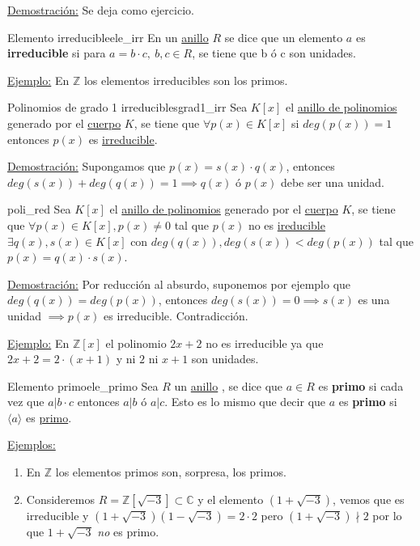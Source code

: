 \documentclass[10pt, a4paper]{article}
\newcommand{\Z}{\mathbb{Z}}
\newcommand{\C}{\mathbb{C}}
\newcommand{\ej}{\underline{Ejemplo:} }
\newcommand{\ejs}{\underline{Ejemplos:} }
\newcommand{\demo}{\underline{Demostración:} }
\newcommand{\anillo}[1][]{\hyperref[def:anillo]{anillo}#1 }
\newcommand{\cuerpo}[1][]{\hyperref[def:cuerpo]{cuerpo}#1 }
\newenvironment{enumeratea}{\begin{enumerate}[label=\arabic*)]}
{\end{enumerate}}
\begin{document}
\demo Se deja como ejercicio.

\begin{definition}{Elemento irreducible}{ele_irr}
En un \anillo $R$ se dice que un elemento $a$ es \textbf{irreducible} si para $a = b \cdot c,\ b, c \in R$, se tiene que b ó c son unidades.
\end{definition}

\ej En $\Z$ los elementos irreducibles son los primos.

\begin{proposition}{Polinomios de grado 1 irreducibles}{grad1_irr}
Sea $K[x]$ el \hyperref[def:anillo_poli]{anillo de polinomios} generado por el \cuerpo $K$, se tiene que $\forall p(x) \in K[x]$ si $deg(p(x)) = 1$ entonces $p(x)$ es \hyperref[def:ele_irr]{irreducible}.
\end{proposition}

\demo Supongamos que $p(x) = s(x) \cdot q(x)$, entonces $deg(s(x)) + deg(q(x)) = 1 \implies q(x) \text{ ó } p(x)$ debe ser una unidad.

\begin{proposition}{}{poli_red}
Sea $K[x]$ el \hyperref[def:anillo_poli]{anillo de polinomios} generado por el \cuerpo $K$, se tiene que $\forall p(x) \in K[x], p(x) \neq 0$ tal que $p(x)$ no es \hyperref[def:ele_irr]{ireducible} $\exists q(x), s(x) \in K[x]$ con $deg(q(x)), deg(s(x)) < deg(p(x))$ tal que $p(x) = q(x) \cdot s(x)$.
\end{proposition}

\demo Por reducción al absurdo, suponemos por ejemplo que $deg(q(x)) = deg(p(x))$, entonces $deg(s(x)) = 0 \implies s(x)$ es una unidad $\implies p(x)$ es irreducible. Contradicción.

\vspace{3mm}

\ej En $\Z[x]$ el polinomio $2x + 2$ no es irreducible ya que $2x + 2 = 2 \cdot (x + 1)$ y ni $2$ ni $x + 1$ son unidades.

\begin{definition}{Elemento primo}{ele_primo}
Sea $R$ un \anillo, se dice que $a \in R$ es \textbf{primo} si cada vez que $a | b \cdot c$ entonces $a | b$ ó $a | c$. Esto es lo mismo que decir que $a$ es \textbf{primo} si $\langle a \rangle$ es \hyperref[def:ideal_primo]{primo}.
\end{definition}

\ejs

\begin{enumeratea}
	\item En $\Z$ los elementos primos son, sorpresa, los primos.
	\item Consideremos $R = \Z[\sqrt{-3}] \subset \C$ y el elemento $(1 + \sqrt{-3})$, vemos que es irreducible y $(1 + \sqrt{-3})(1 - \sqrt{-3}) = 2 \cdot 2$ pero $(1 + \sqrt{-3}) \nmid 2$ por lo que $1 + \sqrt{-3}$ \emph{no} es primo.
\end{enumeratea}
\end{document}

